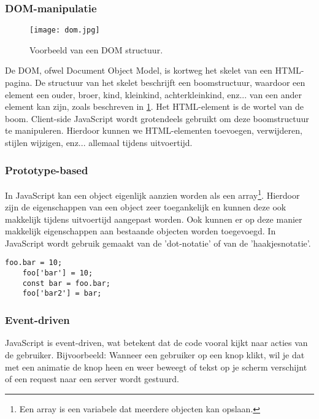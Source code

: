 \subsubsection{DOM-manipulatie}
\label{sec:DOM}
\begin{figure}[h]
	\texttt{[image: dom.jpg]}
	\caption{Voorbeeld van een DOM structuur.}
	\label{fig:dom}
\end{figure}

De DOM, ofwel Document Object Model, is kortweg het skelet van een HTML-pagina. De structuur van het skelet beschrijft een boomstructuur, waardoor een element een ouder, broer, kind, kleinkind, achterkleinkind, enz... van een ander element kan zijn, zoals beschreven in \ref{fig:dom}. Het HTML-element is de wortel van de boom. Client-side JavaScript wordt grotendeels gebruikt om deze boomstructuur te manipuleren. Hierdoor kunnen we HTML-elementen toevoegen, verwijderen, stijlen wijzigen, enz... allemaal tijdens uitvoertijd. \textcite{Kantor2017}

\subsubsection{Prototype-based}
\label{sec:prototypeBased}

In JavaScript kan een object eigenlijk aanzien worden als een array\footnote{Een array is een variabele dat meerdere objecten kan opslaan.}. Hierdoor zijn de eigenschappen van een object zeer toegankelijk en kunnen deze ook makkelijk tijdens uitvoertijd aangepast worden. Ook kunnen er op deze manier makkelijk eigenschappen aan bestaande objecten worden toegevoegd. In JavaScript wordt gebruik gemaakt van de 'dot-notatie' of van de 'haakjesnotatie'. 

\begin{lstlisting}[style=ES6,
	caption={Voorbeeld van de dot-en haakjesnotatie.},
	label=code:dot]
	foo.bar = 10;
	foo['bar'] = 10;
	const bar = foo.bar;
	foo['bar2'] = bar;
\end{lstlisting}

\subsubsection{Event-driven}
\label{sec:eventDriven}

JavaScript is event-driven, wat betekent dat de code vooral kijkt naar acties van de gebruiker. Bijvoorbeeld: Wanneer een gebruiker op een knop klikt, wil je dat met een animatie de knop heen en weer beweegt of tekst op je scherm verschijnt of een request naar een server wordt gestuurd. 

